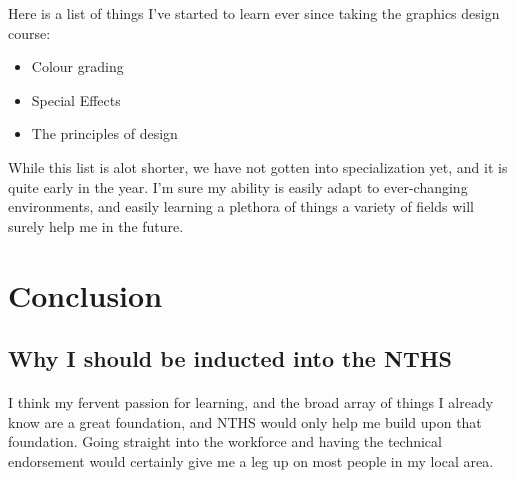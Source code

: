 Here is a list of things I've started to learn ever since taking the graphics design course:

\begin{itemize}
	\item Colour grading
	\item Special Effects
	\item The principles of design
\end{itemize}

While this list is alot shorter, we have not gotten into specialization yet,
and it is quite early in the year. I'm sure my ability is easily adapt to 
ever-changing environments, and easily learning a plethora of things a variety
of fields will surely help me in the future.

\section{Conclusion}
\subsection{Why I should be inducted into the NTHS}

\paragraph{}
I think my fervent passion for learning, and the broad array of things I already 
know are a great foundation, and NTHS would only help me build upon that
foundation. Going straight into the workforce and having the technical
endorsement would certainly give me a leg up on most people in my local area.
